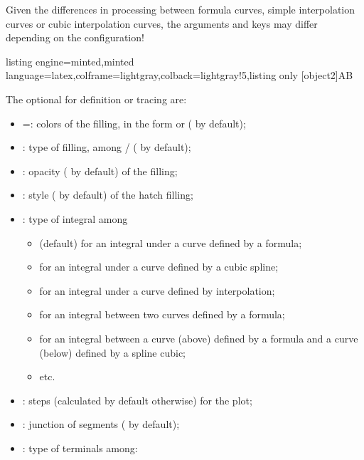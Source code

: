 \documentclass[11pt,a4paper]{ltxdoc}
\begin{document}
\smallskip

{\small\faBomb} Given the differences in processing between formula curves, simple interpolation curves or cubic interpolation curves, the arguments and keys may differ depending on the configuration!

\begin{tcblisting}{listing engine=minted,minted language=latex,colframe=lightgray,colback=lightgray!5,listing only}
[object2]{A}{B}
\end{tcblisting}

The optional \MontreCode{[keys]} for definition or tracing are:

\begin{itemize}
	\item {} =: colors of the filling, in the form  or  ( by default);
	\item {}: type of filling, among / ( by default);
	\item {}: opacity ( by default) of the filling;
	\item {}: style ( by default) of the hatch filling;
	\item {}: type of integral among
	\begin{itemize}
		\item {} (default) for an integral under a curve defined by a formula;
		\item {} for an integral under a curve defined by a cubic spline;
		\item {} for an integral under a curve defined by interpolation;
		\item {} for an integral between two curves defined by a formula;
		\item {} for an integral between a curve (above) defined by a formula and a curve (below) defined by a spline cubic;
		\item etc.
	\end{itemize}
	\item {}: steps (calculated by default otherwise) for the plot;
	\item {}: junction of segments ( by default);
	\item {}: type of terminals among:

\end{itemize}
\end{document}
